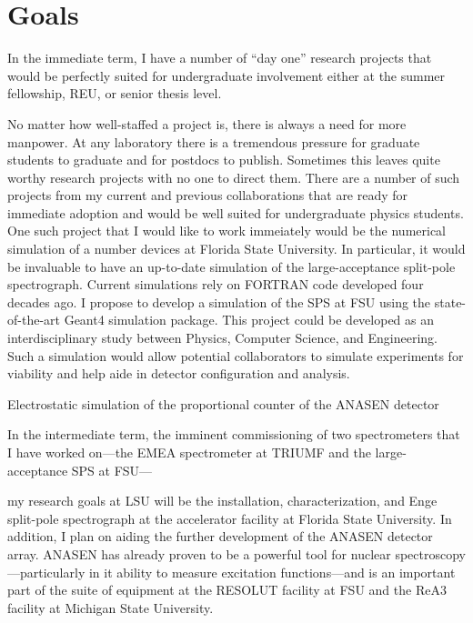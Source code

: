 {%
\section*{Goals}

In the immediate term, I have a number of ``day one'' research projects that would be perfectly suited for undergraduate involvement either at the summer fellowship, REU, or senior thesis level.

No matter how well-staffed a project is, there is always a need for more manpower. At any laboratory there is a tremendous pressure for graduate students to graduate and for postdocs to publish. Sometimes this leaves quite worthy research projects with no one to direct them. There are a number of such projects from my current and previous collaborations that are ready for immediate adoption and would be well suited for undergraduate physics students.
One such project that I would like to work immeiately would be the numerical simulation of a number devices at Florida State University. In particular, it would be invaluable to have an up-to-date simulation of the large-acceptance split-pole spectrograph. Current simulations rely on FORTRAN code developed four decades ago. I propose to develop a simulation of the SPS at FSU using the state-of-the-art Geant4 simulation package. This project could be developed as an interdisciplinary study between Physics, Computer Science, and Engineering. Such a simulation would allow potential collaborators to simulate experiments for viability and help aide in detector configuration and analysis.

Electrostatic simulation of the proportional counter of the ANASEN detector

In the intermediate term, the imminent commissioning of two spectrometers that I have worked on---the EMEA spectrometer at TRIUMF and the large-acceptance SPS at FSU--- 


my research goals at LSU will be the installation, characterization, and 
Enge split-pole spectrograph %
at the accelerator facility at Florida State University.
In addition, I plan on aiding the further development of the ANASEN detector array. 
ANASEN has already proven to be a powerful tool for nuclear spectroscopy---particularly in it ability to measure excitation functions---and is an important part of the suite of equipment at the RESOLUT facility at FSU and the ReA3 facility at Michigan State University. 

}
